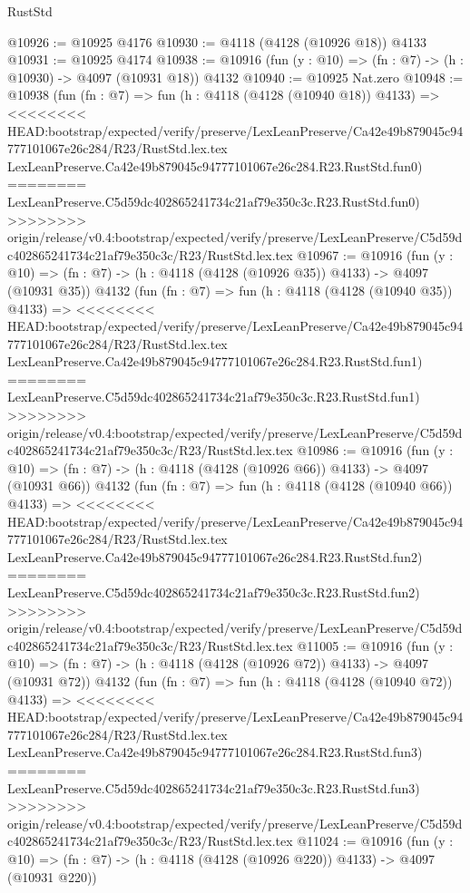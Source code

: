\begin{lexlean}{RustStd}
\begin{coremodule}
{\begin{coremodule}
{{{{{{{{{{{{{{@10926 := @10925 @4176
@10930 := @4118 (@4128 (@10926 @18)) @4133
@10931 := @10925 @4174
@10938 := @10916 (fun (y : @10) => (fn : @7) -> (h : @10930) -> @4097 (@10931 @18)) @4132
@10940 := @10925 Nat.zero
@10948 := @10938
    (fun (fn : @7) =>
    fun (h : @4118 (@4128 (@10940 @18)) @4133) =>
<<<<<<<< HEAD:bootstrap/expected/verify/preserve/LexLeanPreserve/Ca42e49b879045c94777101067e26c284/R23/RustStd.lex.tex
    LexLeanPreserve.Ca42e49b879045c94777101067e26c284.R23.RustStd.fun0)
========
    LexLeanPreserve.C5d59dc402865241734c21af79e350c3c.R23.RustStd.fun0)
>>>>>>>> origin/release/v0.4:bootstrap/expected/verify/preserve/LexLeanPreserve/C5d59dc402865241734c21af79e350c3c/R23/RustStd.lex.tex
@10967 := @10916
    (fun (y : @10) => (fn : @7) -> (h : @4118 (@4128 (@10926 @35)) @4133) -> @4097 (@10931 @35))
    @4132
    (fun (fn : @7) =>
    fun (h : @4118 (@4128 (@10940 @35)) @4133) =>
<<<<<<<< HEAD:bootstrap/expected/verify/preserve/LexLeanPreserve/Ca42e49b879045c94777101067e26c284/R23/RustStd.lex.tex
    LexLeanPreserve.Ca42e49b879045c94777101067e26c284.R23.RustStd.fun1)
========
    LexLeanPreserve.C5d59dc402865241734c21af79e350c3c.R23.RustStd.fun1)
>>>>>>>> origin/release/v0.4:bootstrap/expected/verify/preserve/LexLeanPreserve/C5d59dc402865241734c21af79e350c3c/R23/RustStd.lex.tex
@10986 := @10916
    (fun (y : @10) => (fn : @7) -> (h : @4118 (@4128 (@10926 @66)) @4133) -> @4097 (@10931 @66))
    @4132
    (fun (fn : @7) =>
    fun (h : @4118 (@4128 (@10940 @66)) @4133) =>
<<<<<<<< HEAD:bootstrap/expected/verify/preserve/LexLeanPreserve/Ca42e49b879045c94777101067e26c284/R23/RustStd.lex.tex
    LexLeanPreserve.Ca42e49b879045c94777101067e26c284.R23.RustStd.fun2)
========
    LexLeanPreserve.C5d59dc402865241734c21af79e350c3c.R23.RustStd.fun2)
>>>>>>>> origin/release/v0.4:bootstrap/expected/verify/preserve/LexLeanPreserve/C5d59dc402865241734c21af79e350c3c/R23/RustStd.lex.tex
@11005 := @10916
    (fun (y : @10) => (fn : @7) -> (h : @4118 (@4128 (@10926 @72)) @4133) -> @4097 (@10931 @72))
    @4132
    (fun (fn : @7) =>
    fun (h : @4118 (@4128 (@10940 @72)) @4133) =>
<<<<<<<< HEAD:bootstrap/expected/verify/preserve/LexLeanPreserve/Ca42e49b879045c94777101067e26c284/R23/RustStd.lex.tex
    LexLeanPreserve.Ca42e49b879045c94777101067e26c284.R23.RustStd.fun3)
========
    LexLeanPreserve.C5d59dc402865241734c21af79e350c3c.R23.RustStd.fun3)
>>>>>>>> origin/release/v0.4:bootstrap/expected/verify/preserve/LexLeanPreserve/C5d59dc402865241734c21af79e350c3c/R23/RustStd.lex.tex
@11024 := @10916
    (fun (y : @10) => (fn : @7) -> (h : @4118 (@4128 (@10926 @220)) @4133) -> @4097 (@10931 @220))
}}}}}}}}}}}}}}
\end{coremodule}}
\end{coremodule}
\end{lexlean}
